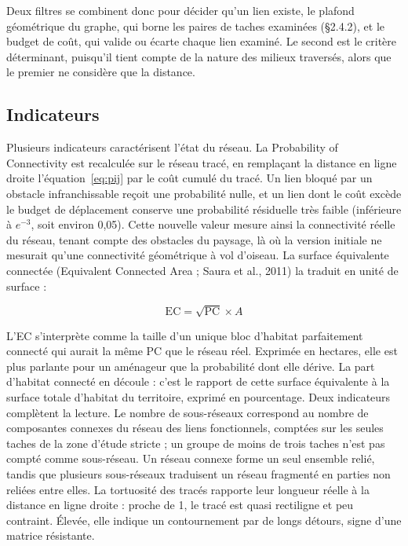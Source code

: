 \documentclass[a4paper,12pt]{report}
\begin{document}
Deux filtres se combinent donc pour décider qu'un lien existe, le plafond géométrique du graphe, qui borne les paires de taches examinées (§2.4.2), et le budget de coût, qui valide ou écarte chaque lien examiné. Le second est le critère déterminant, puisqu'il tient compte de la nature des milieux traversés, alors que le premier ne considère que la distance.

\subsection{Indicateurs}
Plusieurs indicateurs caractérisent l'état du réseau. La Probability of Connectivity est recalculée sur le réseau tracé, en remplaçant la distance en ligne droite l'équation~\eqref{eq:pij} par le coût cumulé du tracé. Un lien bloqué par un obstacle infranchissable reçoit une probabilité nulle, et un lien dont le coût excède le budget de déplacement conserve une probabilité résiduelle très faible (inférieure à $e^{-3}$, soit environ 0,05). Cette nouvelle valeur mesure ainsi la connectivité réelle du réseau, tenant compte des obstacles du paysage, là où la version initiale ne mesurait qu'une connectivité géométrique à vol d'oiseau. La surface équivalente connectée (Equivalent Connected Area ; Saura et al., 2011) la traduit en unité de surface :

\begin{equation}\label{eq:ec}
\mathrm{EC} = \sqrt{\mathrm{PC}} \times A
\end{equation}

L'EC s'interprète comme la taille d'un unique bloc d'habitat parfaitement connecté qui aurait la même PC que le réseau réel. Exprimée en hectares, elle est plus parlante pour un aménageur que la probabilité dont elle dérive. La part d'habitat connecté en découle : c'est le rapport de cette surface équivalente à la surface totale d'habitat du territoire, exprimé en pourcentage. Deux indicateurs complètent la lecture. Le nombre de sous-réseaux correspond au nombre de composantes connexes du réseau des liens fonctionnels, comptées sur les seules taches de la zone d'étude stricte ; un groupe de moins de trois taches n'est pas compté comme sous-réseau. Un réseau connexe forme un seul ensemble relié, tandis que plusieurs sous-réseaux traduisent un réseau fragmenté en parties non reliées entre elles. La tortuosité des tracés rapporte leur longueur réelle à la distance en ligne droite : proche de 1, le tracé est quasi rectiligne et peu contraint. Élevée, elle indique un contournement par de longs détours, signe d'une matrice résistante.
\end{document}
